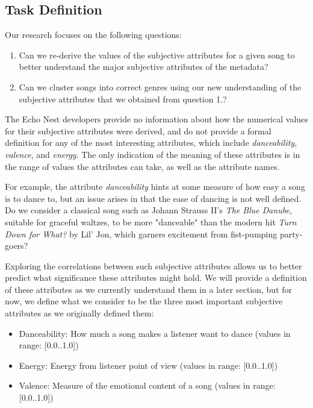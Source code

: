 \documentclass{article}
\begin{document}
\subsection{Task Definition}
Our research focuses on the following questions:
\begin{enumerate}
\item Can we re-derive the values of the subjective attributes for a given song
  to better understand the major subjective attributes of the metadata?
\item Can we cluster songs into correct genres using our new understanding of
  the subjective attributes that we obtained from question 1.?
\end{enumerate}

The Echo Nest developers provide no information about how the numerical values
for their subjective attributes were derived, and do not provide a formal
definition for any of the most interesting attributes, which include
\textit{danceability}, \textit{valence}, and \textit{energy}. The only indication
of the meaning of these attributes is in the range of values the attributes can
take, as well as the attribute names.

For example, the attribute \textit{danceability} hints at some measure of how
easy a song is to dance to, but an issue arises in that the ease of dancing is
not well defined. Do we consider a classical song such as Johann Strauss II's
\textit{The Blue Danube}, suitable for graceful waltzes, to be more "danceable"
than the modern hit \textit{Turn Down for What?} by Lil' Jon, which garners
excitement from fist-pumping party-goers?

Exploring the correlations between such subjective attributes allows us to better
predict what significance these attributes might hold. We will provide a
definition of these attributes as we currently understand them in a later section,
but for now, we define what we consider to be the three most important subjective
attributes as we originally defined them:
\begin{itemize}
\item Danceability: How much a song makes a listener want to dance (values in range:
  [0.0..1.0])
\item Energy: Energy from listener point of view (values in range: [0.0..1.0])
\item Valence: Measure of the emotional content of a song (values in range:
  [0.0..1.0])
\end{itemize}
\end{document}
